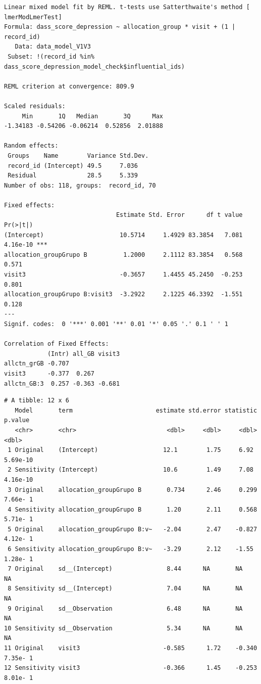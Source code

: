 \documentclass[
  letterpaper,
  DIV=11,
  numbers=noendperiod]{scrartcl}
\newenvironment{Shaded}{\begin{snugshade}}{\end{snugshade}}
\newcommand{\NormalTok}[1]{\textcolor[rgb]{0.00,0.23,0.31}{#1}}
\newcommand{\SpecialCharTok}[1]{\textcolor[rgb]{0.37,0.37,0.37}{#1}}
\begin{document}
\begin{verbatim}
Linear mixed model fit by REML. t-tests use Satterthwaite's method [
lmerModLmerTest]
Formula: dass_score_depression ~ allocation_group * visit + (1 | record_id)
   Data: data_model_V1V3
 Subset: !(record_id %in% dass_score_depression_model_check$influential_ids)

REML criterion at convergence: 809.9

Scaled residuals: 
     Min       1Q   Median       3Q      Max 
-1.34183 -0.54206 -0.06214  0.52856  2.01888 

Random effects:
 Groups    Name        Variance Std.Dev.
 record_id (Intercept) 49.5     7.036   
 Residual              28.5     5.339   
Number of obs: 118, groups:  record_id, 70

Fixed effects:
                               Estimate Std. Error      df t value Pr(>|t|)    
(Intercept)                     10.5714     1.4929 83.3854   7.081 4.16e-10 ***
allocation_groupGrupo B          1.2000     2.1112 83.3854   0.568    0.571    
visit3                          -0.3657     1.4455 45.2450  -0.253    0.801    
allocation_groupGrupo B:visit3  -3.2922     2.1225 46.3392  -1.551    0.128    
---
Signif. codes:  0 '***' 0.001 '**' 0.01 '*' 0.05 '.' 0.1 ' ' 1

Correlation of Fixed Effects:
            (Intr) all_GB visit3
allctn_grGB -0.707              
visit3      -0.377  0.267       
allctn_GB:3  0.257 -0.363 -0.681
\end{verbatim}

\begin{Shaded}
\end{Shaded}

\begin{verbatim}
# A tibble: 12 x 6
   Model       term                       estimate std.error statistic   p.value
   <chr>       <chr>                         <dbl>     <dbl>     <dbl>     <dbl>
 1 Original    (Intercept)                  12.1        1.75     6.92   5.69e-10
 2 Sensitivity (Intercept)                  10.6        1.49     7.08   4.16e-10
 3 Original    allocation_groupGrupo B       0.734      2.46     0.299  7.66e- 1
 4 Sensitivity allocation_groupGrupo B       1.20       2.11     0.568  5.71e- 1
 5 Original    allocation_groupGrupo B:v~   -2.04       2.47    -0.827  4.12e- 1
 6 Sensitivity allocation_groupGrupo B:v~   -3.29       2.12    -1.55   1.28e- 1
 7 Original    sd__(Intercept)               8.44      NA       NA     NA       
 8 Sensitivity sd__(Intercept)               7.04      NA       NA     NA       
 9 Original    sd__Observation               6.48      NA       NA     NA       
10 Sensitivity sd__Observation               5.34      NA       NA     NA       
11 Original    visit3                       -0.585      1.72    -0.340  7.35e- 1
12 Sensitivity visit3                       -0.366      1.45    -0.253  8.01e- 1
\end{verbatim}
\end{document}
